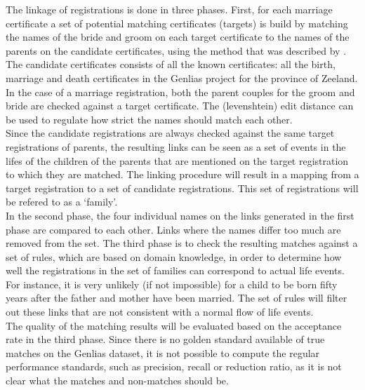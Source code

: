 The linkage of registrations is done in three phases. First, for each marriage certificate a set of potential matching certificates (targets) is build by matching the names of the bride and groom on each target certificate to the names of the parents on the candidate certificates, using the method that was described by \cite{Aspects001}. The candidate certificates consists of all the known certificates: all the birth, marriage and death certificates in the Genlias project for the province of Zeeland. In the case of a marriage registration, both the parent couples for the groom and bride are checked against a target certificate. 
The (levenshtein) edit distance can be used to regulate how strict the names should match each other.\\
Since the candidate registrations are always checked against the same target registrations of parents, the resulting links can be seen as a set of events in the lifes of the children of the parents that are mentioned on the target registration to which they are matched. The linking procedure will result in a mapping from a target registration to a set of candidate registrations. This set of registrations will be refered to as a `family'.\\

In the second phase, the four individual names on the links generated in the first phase are compared to each other. Links where the names differ too much are removed from the set. The third phase is to check the resulting matches against a set of rules, which are based on domain knowledge, in order to determine how well the registrations in the set of families can correspond to actual life events. For instance, it is very unlikely (if not impossible) for a child to be born fifty years after the father and mother have been married. The set of rules will filter out these links that are not consistent with a normal flow of life events.\\

The quality of the matching results will be evaluated based on the acceptance rate in the third phase. Since there is no golden standard available of true matches on the Genlias dataset, it is not possible to compute the regular performance standards, such as precision, recall or reduction ratio, as it is not clear what the matches and non-matches should be.